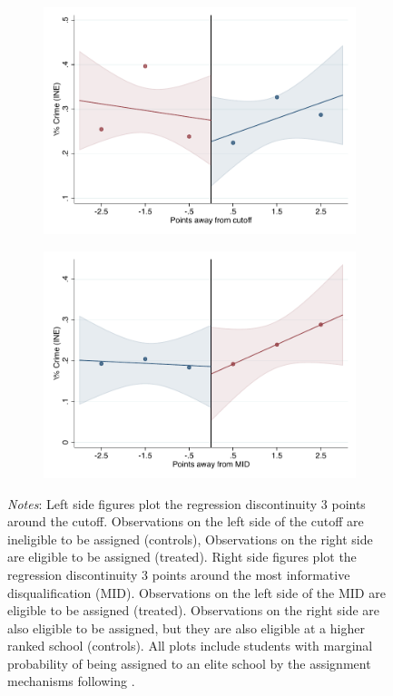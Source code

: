 \documentclass[oneside,11pt]{article}
\begin{document}
\begin{figure}[H]
\begin{center}
    \begin{subfigure}{0.475\textwidth}
        \centering
        \includegraphics[width=\textwidth]{04_Figures/rd_plot_tau_Suspencion_INE_IPN3.pdf}
    \end{subfigure}
    \begin{subfigure}{0.475\textwidth}
        \centering
        \includegraphics[width=\textwidth]{04_Figures/rd_plot_mid_Suspencion_INE_IPN3.pdf}
    \end{subfigure}
    \end{center}
    
\footnotesize
\textit{Notes}: Left side figures plot the regression discontinuity 3 points around the cutoff. Observations on the left side of the cutoff are ineligible to be assigned (controls), Observations on the right side are eligible to be assigned (treated). Right side figures plot the regression discontinuity 3 points around the most informative disqualification (MID). Observations on the left side of the MID are eligible to be assigned (treated). Observations on the right side are also eligible to be assigned, but they are also eligible at a higher ranked school (controls). All plots include students with marginal probability of being assigned to an elite school by the assignment mechanisms following \citet{abdulkadirouglu2022breaking}. 
\end{figure}
\end{document}
